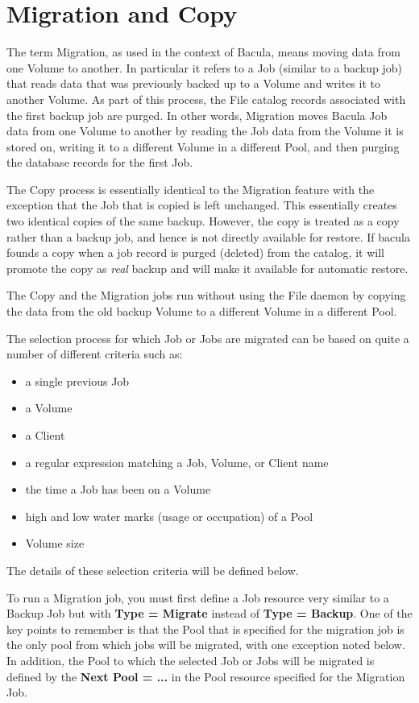 
\chapter{Migration and Copy}
\label{MigrationChapter}

The term Migration, as used in the context of Bacula, means moving data from
one Volume to another.  In particular it refers to a Job (similar to a backup
job) that reads data that was previously backed up to a Volume and writes
it to another Volume.  As part of this process, the File catalog records
associated with the first backup job are purged.  In other words, Migration
moves Bacula Job data from one Volume to another by reading the Job data
from the Volume it is stored on, writing it to a different Volume in a
different Pool, and then purging the database records for the first Job.

The Copy process is essentially identical to the Migration feature with the
exception that the Job that is copied is left unchanged.  This essentially
creates two identical copies of the same backup. However, the copy is treated
as a copy rather than a backup job, and hence is not directly available for
restore. If bacula founds a copy when a job record is purged (deleted) from the
catalog, it will promote the copy as \textsl{real} backup and will make it
available for automatic restore. 

The Copy and the Migration jobs run without using the File daemon by copying
the data from the old backup Volume to a different Volume in a different Pool.

The selection process for which Job or Jobs are migrated
can be based on quite a number of different criteria such as:
\begin{itemize} 
\item a single previous Job
\item a Volume
\item a Client
\item a regular expression matching a Job, Volume, or Client name
\item the time a Job has been on a Volume
\item high and low water marks (usage or occupation) of a Pool
\item Volume size
\end{itemize}

The details of these selection criteria will be defined below.

To run a Migration job, you must first define a Job resource very similar
to a Backup Job but with {\bf Type = Migrate} instead of {\bf Type =
Backup}.  One of the key points to remember is that the Pool that is 
specified for the migration job is the only pool from which jobs will
be migrated, with one exception noted below. In addition, the Pool to
which the selected Job or Jobs will be migrated is defined by the {\bf
Next Pool = ...} in the Pool resource specified for the Migration Job.

